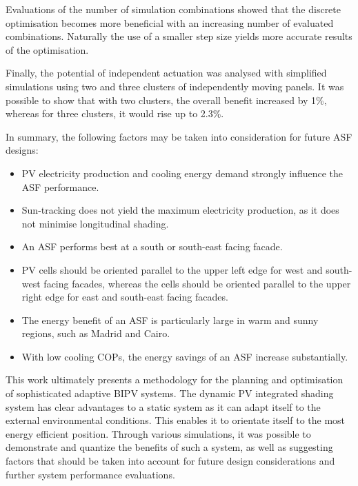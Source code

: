 Evaluations of the number of simulation combinations showed that the discrete optimisation becomes more beneficial with an increasing number of evaluated combinations. Naturally the use of a smaller step size yields more accurate results of the optimisation. 

Finally, the potential of independent actuation was analysed with simplified simulations using two and three clusters of independently moving panels. It was possible to show that with two clusters, the overall benefit increased by 1\%, whereas for three clusters, it would rise up to 2.3\%. 

In summary, the following factors may be taken into consideration for future ASF designs:

\begin{itemize}

\item PV electricity production and cooling energy demand strongly influence the ASF performance.
\item Sun-tracking does not yield the maximum electricity production, as it does not minimise longitudinal shading.
\item An ASF performs best at a south or south-east facing facade.
\item PV cells should be oriented parallel to the upper left edge for west and south-west facing facades, whereas the cells should be oriented parallel to the upper right edge for east and south-east facing facades. 
\item The energy benefit of an ASF is particularly large in warm and sunny regions, such as Madrid and Cairo.
\item With low cooling COPs, the energy savings of an ASF increase substantially.

\end{itemize}

This work ultimately presents a methodology for the planning and optimisation of sophisticated adaptive BIPV systems. The dynamic PV integrated shading system has clear advantages to a static system as it can adapt itself to the external environmental conditions. This enables it to orientate itself to the most energy efficient position. Through various simulations, it was possible to demonstrate and quantize the benefits of such a system, as well as suggesting factors that should be taken into account for future design considerations and further system performance evaluations. 